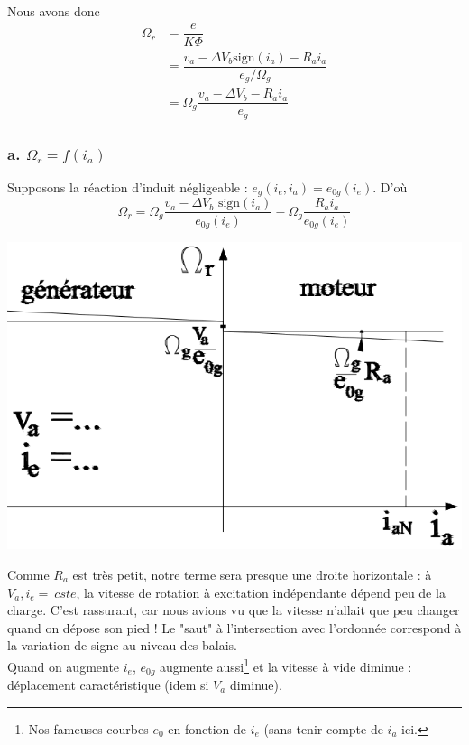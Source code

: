 	Nous avons donc
	\begin{equation}
	\begin{array}{ll}
	\Omega_r &= \dfrac{e}{K\Phi}\\
	&= \dfrac{v_a -\Delta V_b\text{sign}(i_a) - R_ai_a}{e_g/\Omega_g}\\
	&= \Omega_g\dfrac{v_a -\Delta V_b - R_ai_a}{e_g}	
	\end{array}
	\end{equation}
	
		\subsubsection{a. $\Omega_r = f(i_a)$}
		Supposons la réaction d'induit négligeable : $e_g(i_e,i_a) = e_{0g}(i_e)$. D'où
		\begin{equation}
		\Omega_r = \Omega_g \dfrac{v_a-\Delta V_b\text{ sign}(i_a)}{e_{0g}(i_e)}- 
		\Omega_g \dfrac{R_ai_a}{e_{0g}(i_e)}
		\end{equation}

\begin{center}
	\includegraphics[scale=0.34]{ch4/image23.png}
\end{center}
		Comme $R_a$ est très petit, notre terme sera presque une droite horizontale : à 
		$V_a, i_e=\ cste$, la vitesse de rotation à excitation indépendante dépend peu de 
		la charge. C'est rassurant, car nous avions vu que la vitesse n'allait que peu 
		changer quand on dépose son pied ! Le 	"saut" à l'intersection avec l'ordonnée 
		correspond à la variation de signe au niveau des balais. \\
		Quand on augmente $i_e$, $e_{0g}$ augmente aussi\footnote{Nos fameuses courbes $e_0$ 
		en fonction de $i_e$ (sans tenir compte de $i_a$ ici.} et la vitesse à vide diminue : 
		déplacement caractéristique (idem si $V_a$ diminue). \\
		
